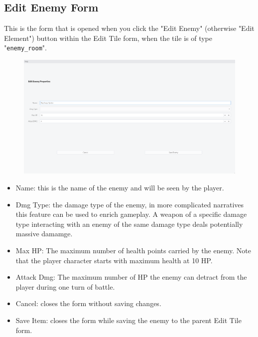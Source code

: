 \documentclass{article} \usepackage[margin=1in,headheight=57pt,headsep=0.1in]{geometry}
\begin{document}
\newpage
\subsection{Edit Enemy Form}
This is the form that is opened when you click the "Edit Enemy" (otherwise "Edit Element") button within the Edit Tile form, when the tile is of type "\texttt{enemy\_room}".
\begin{figure}[H]
	\centering
	\includegraphics[width=1.0\textwidth]{./editEnemyForm.png}
\end{figure}
\begin{itemize}
	\item Name: this is the name of the enemy and will be seen by the player.
	\item Dmg Type: the damage type of the enemy, in more complicated narratives this feature can be used to enrich gameplay. A weapon of a specific damage type interacting with an enemy of the same damage type deals potentially massive damamge.
	\item Max HP: The maximum number of health points carried by the enemy. Note that the player character starts with maximum health at 10 HP.
	\item Attack Dmg: The maximum number of HP the enemy can detract from the player during one turn of battle.
	\item Cancel: closes the form without saving changes.
	\item Save Item: closes the form while saving the enemy to the parent Edit Tile form.
\end{itemize}
\newpage
\end{document}
